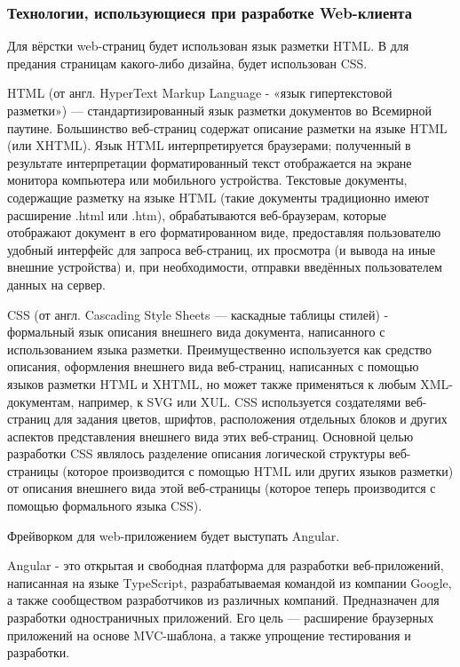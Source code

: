 
\subsubsection{Технологии, использующиеся при разработке Web-клиента}\indent

Для вёрстки web-страниц будет использован язык разметки HTML. В для предания страницам какого-либо дизайна, будет использован CSS.

HTML (от англ. HyperText Markup Language - «язык гипертекстовой разметки») — стандартизированный язык разметки документов во Всемирной паутине.
Большинство веб-страниц содержат описание разметки на языке HTML (или XHTML).
Язык HTML интерпретируется браузерами;
полученный в результате интерпретации форматированный текст отображается на экране монитора компьютера или мобильного устройства.
Текстовые документы, содержащие разметку на языке HTML (такие документы традиционно имеют расширение .html или .htm), обрабатываются веб-браузерам, которые отображают документ в его форматированном виде, предоставляя пользователю удобный интерфейс для запроса веб-страниц, их просмотра (и вывода на иные внешние устройства) и, при необходимости, отправки введённых пользователем данных на сервер.\cite{web-technologies}

CSS (от англ. Cascading Style Sheets — каскадные таблицы стилей) - формальный язык описания внешнего вида документа, написанного с использованием языка разметки.
Преимущественно используется как средство описания, оформления внешнего вида веб-страниц, написанных с помощью языков разметки HTML и XHTML, но может также применяться к любым XML-документам, например, к SVG или XUL. CSS используется создателями веб-страниц для задания цветов, шрифтов, расположения отдельных блоков и других аспектов представления внешнего вида этих веб-страниц. Основной целью разработки CSS являлось разделение описания логической структуры веб-страницы (которое производится с помощью HTML или других языков разметки) от описания внешнего вида этой веб-страницы (которое теперь производится с помощью формального языка CSS).\cite{web-technologies}

Фрейворком для web-приложением будет выступать Angular.

Angular - это открытая и свободная платформа для разработки веб-приложений, написанная на языке TypeScript, разрабатываемая командой из компании Google, а также сообществом разработчиков из различных компаний.
Предназначен для разработки одностраничных приложений.
Его цель — расширение браузерных приложений на основе MVC-шаблона, а также упрощение тестирования и разработки.

